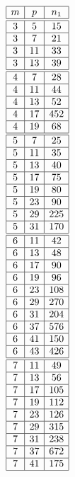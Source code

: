 \documentclass[a4paper, 10pt]{article}
\begin{document}
\begin{center}
\begin{minipage}[t]{.23\textwidth}
\begin{displaymath}
\begin{array}{|c|c|c|}
\hline
m & p & n_{1} \\ \hline
\hline
3 & 5 & 15 \\ \hline
3 & 7 & 21 \\ \hline
3 & 11 & 33 \\ \hline
3 & 13 & 39 \\ \hline
\hline
4 & 7 & 28 \\ \hline
4 & 11 & 44 \\ \hline
4 & 13 & 52 \\ \hline
4 & 17 & 452 \\ \hline
4 & 19 & 68 \\ \hline
\hline
5 & 7 & 25 \\ \hline
5 & 11 & 35 \\ \hline
5 & 13 & 40 \\ \hline
5 & 17 & 75 \\ \hline
5 & 19 & 80 \\ \hline
5 & 23 & 90 \\ \hline
5 & 29 & 225 \\ \hline
5 & 31 & 170 \\ \hline
\hline
6 & 11 & 42 \\ \hline
6 & 13 & 48 \\ \hline
6 & 17 & 90 \\ \hline
6 & 19 & 96 \\ \hline
6 & 23 & 108 \\ \hline
6 & 29 & 270 \\ \hline
6 & 31 & 204 \\ \hline
6 & 37 & 576 \\ \hline
6 & 41 & 150 \\ \hline
6 & 43 & 426 \\ \hline
\hline
7 & 11 & 49 \\ \hline
7 & 13 & 56 \\ \hline
7 & 17 & 105 \\ \hline
7 & 19 & 112 \\ \hline
7 & 23 & 126 \\ \hline
7 & 29 & 315 \\ \hline
7 & 31 & 238 \\ \hline
7 & 37 & 672 \\ \hline
7 & 41 & 175 \\ \hline

\end{array}
\end{displaymath}
\end{minipage}
\end{center}
\end{document}
